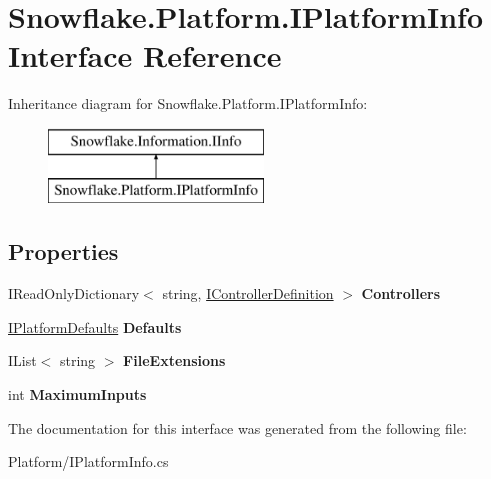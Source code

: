 \hypertarget{interface_snowflake_1_1_platform_1_1_i_platform_info}{}\section{Snowflake.\+Platform.\+I\+Platform\+Info Interface Reference}
\label{interface_snowflake_1_1_platform_1_1_i_platform_info}
Inheritance diagram for Snowflake.\+Platform.\+I\+Platform\+Info\+:\begin{figure}[H]
\begin{center}
\leavevmode
\includegraphics[height=2.000000cm]{interface_snowflake_1_1_platform_1_1_i_platform_info}
\end{center}
\end{figure}
\subsection*{Properties}
\begin{DoxyCompactItemize}
\item 
\hypertarget{interface_snowflake_1_1_platform_1_1_i_platform_info_a1151f29fd2b955e694257a3ea83b19eb}{}I\+Read\+Only\+Dictionary$<$ string, \hyperlink{interface_snowflake_1_1_controller_1_1_i_controller_definition}{I\+Controller\+Definition} $>$ {\bfseries Controllers}\label{interface_snowflake_1_1_platform_1_1_i_platform_info_a1151f29fd2b955e694257a3ea83b19eb}

\item 
\hypertarget{interface_snowflake_1_1_platform_1_1_i_platform_info_a0ce0061b2706d418974f14552cf33f38}{}\hyperlink{interface_snowflake_1_1_platform_1_1_i_platform_defaults}{I\+Platform\+Defaults} {\bfseries Defaults}\label{interface_snowflake_1_1_platform_1_1_i_platform_info_a0ce0061b2706d418974f14552cf33f38}

\item 
\hypertarget{interface_snowflake_1_1_platform_1_1_i_platform_info_a2e12201a96a5804f7f97dc3239d6a4d3}{}I\+List$<$ string $>$ {\bfseries File\+Extensions}\label{interface_snowflake_1_1_platform_1_1_i_platform_info_a2e12201a96a5804f7f97dc3239d6a4d3}

\item 
\hypertarget{interface_snowflake_1_1_platform_1_1_i_platform_info_a3d087c38d145982e8fb26d5adbaaf545}{}int {\bfseries Maximum\+Inputs}\label{interface_snowflake_1_1_platform_1_1_i_platform_info_a3d087c38d145982e8fb26d5adbaaf545}

\end{DoxyCompactItemize}


The documentation for this interface was generated from the following file\+:\begin{DoxyCompactItemize}
\item 
Platform/I\+Platform\+Info.\+cs\end{DoxyCompactItemize}
